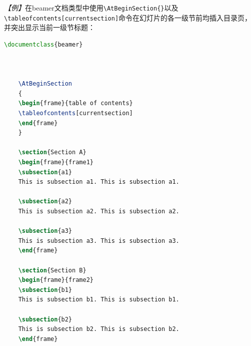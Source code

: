 \emph{【例】}在beamer文档类型中使用\texttt{\textbackslash{}AtBeginSection\{\}}以及\texttt{\textbackslash{}tableofcontents[currentsection]}命令在幻灯片的各一级节前均插入目录页，并突出显示当前一级节标题：
\begin{lstlisting}[language=TeX]
    \documentclass{beamer}

    

    \AtBeginSection
    {
    \begin{frame}{table of contents}
    \tableofcontents[currentsection]
    \end{frame}
    }

    \section{Section A}
    \begin{frame}{frame1}
    \subsection{a1}
    This is subsection a1. This is subsection a1.

    \subsection{a2}
    This is subsection a2. This is subsection a2.

    \subsection{a3}
    This is subsection a3. This is subsection a3.
    \end{frame}

    \section{Section B}
    \begin{frame}{frame2}
    \subsection{b1}
    This is subsection b1. This is subsection b1.

    \subsection{b2}
    This is subsection b2. This is subsection b2.
    \end{frame}


\end{lstlisting}
